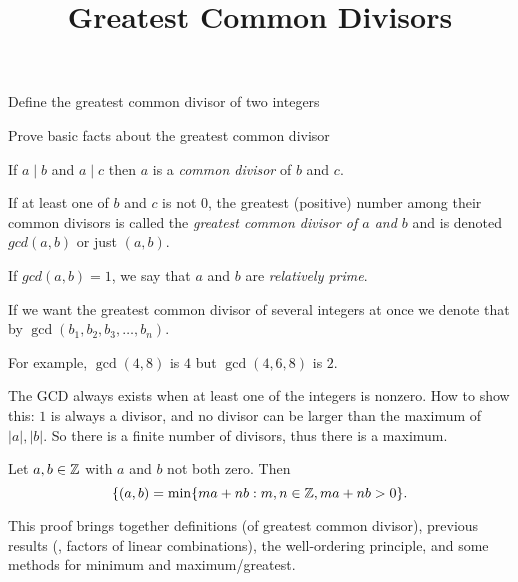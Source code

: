 \documentclass{ximera}
\title{Greatest Common Divisors}
\begin{document}
\begin{abstract}
\end{abstract}
\maketitle


\begin{obj}
\item Define the greatest common divisor of two integers
\item Prove basic facts about the greatest common divisor
\end{obj}


\begin{defn}\label{defn:gcd} 
  If $a\mid b$ and $a\mid c$ then $a$ is a \emph{common divisor} of $b$ and $c$.

  If at least one of $b$ and $c$ is not $0$, the greatest (positive) number among their common divisors  is called the \emph{greatest common divisor of $a$ and $b$} and is denoted $gcd(a,b)$ or just $(a,b)$. 
 
  If $gcd(a,b)=1$, we say that $a$ and $b$ are \emph{relatively prime}.

  If we want the greatest common divisor of several integers at once we denote that by $\gcd(b_1,b_2,b_3,\dots,b_n)$.
\end{defn}

For example, $\gcd(4,8)$ is $4$ but $\gcd(4,6,8)$ is $2$.

The GCD always exists when at least one of the integers is nonzero. How to show this: $1$ is always a divisor, and no divisor can be larger than the maximum of $|a|,|b|$. So there is a finite number of divisors, thus there is a maximum.


\begin{proposition}\label{Bezout}
  Let $a, b\in \mathbb Z$ with $a$ and $b$ not both zero. Then 
    \[\{(a,b)=\min\{ma+nb:m,n\in\mathbb Z, ma+nb>0\}.\]
\end{proposition}
This proof brings together definitions (of greatest common divisor), previous results (, factors of linear combinations), the well-ordering principle, and some methods for minimum and maximum/greatest.
\end{document}
